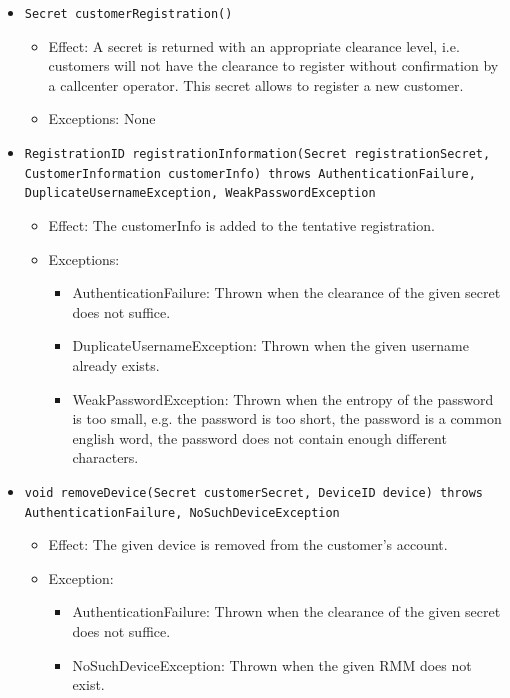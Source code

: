 \documentclass[a4paper,10pt]{article}
\begin{document}
\begin{itemize}
\begin{itemize}
        \item \texttt{Secret customerRegistration()}
        \begin{itemize}
            \item Effect: A secret is returned with an appropriate clearance level, i.e. customers will not have the clearance to register without confirmation by a callcenter operator.  This secret allows to register a new customer.
            \item Exceptions: None
        \end{itemize}
        
        \item \texttt{RegistrationID registrationInformation(Secret registrationSecret, CustomerInformation customerInfo) throws AuthenticationFailure, DuplicateUsernameException, WeakPasswordException}
        \begin{itemize}
            \item Effect: The customerInfo is added to the tentative registration.
            \item Exceptions:
            \begin{itemize}
            	\item AuthenticationFailure: Thrown when the clearance of the given secret does not suffice.
                \item DuplicateUsernameException: Thrown when the given username already exists.
                \item WeakPasswordException: Thrown when the entropy of the password is too small, e.g. the password is too short, the password is a common english word, the password does not contain enough different characters.
            \end{itemize}
        \end{itemize}
        
         \item \texttt{void removeDevice(Secret customerSecret, DeviceID device) throws AuthenticationFailure, NoSuchDeviceException}
        \begin{itemize}
        	\item Effect: The given device is removed from the customer's account.
            \item Exception:
           	\begin{itemize}
            	\item AuthenticationFailure: Thrown when the clearance of the given secret does not suffice.
                \item NoSuchDeviceException: Thrown when the given RMM does not exist.
            \end{itemize}
        \end{itemize}
        

\end{itemize}
\end{itemize}
\end{document}
